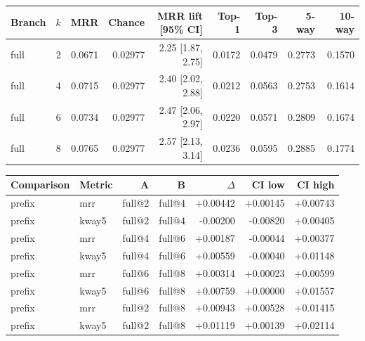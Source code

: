\begin{tabular}{lrrrrrrrr}
Branch & $k$ & MRR & Chance & MRR lift [95\% CI] & Top-1 & Top-3 & 5-way & 10-way \\
\hline
full & 2 & 0.0671 & 0.02977 & 2.25 [1.87, 2.75] & 0.0172 & 0.0479 & 0.2773 & 0.1570 \\
full & 4 & 0.0715 & 0.02977 & 2.40 [2.02, 2.88] & 0.0212 & 0.0563 & 0.2753 & 0.1614 \\
full & 6 & 0.0734 & 0.02977 & 2.47 [2.06, 2.97] & 0.0220 & 0.0571 & 0.2809 & 0.1674 \\
full & 8 & 0.0765 & 0.02977 & 2.57 [2.13, 3.14] & 0.0236 & 0.0595 & 0.2885 & 0.1774 \\
\end{tabular}
\begin{tabular}{llrrrrr}
Comparison & Metric & A & B & $\Delta$ & CI low & CI high \\
\hline
prefix & mrr & full@2 & full@4 & +0.00442 & +0.00145 & +0.00743 \\
prefix & kway5 & full@2 & full@4 & -0.00200 & -0.00820 & +0.00405 \\
prefix & mrr & full@4 & full@6 & +0.00187 & -0.00044 & +0.00377 \\
prefix & kway5 & full@4 & full@6 & +0.00559 & -0.00040 & +0.01148 \\
prefix & mrr & full@6 & full@8 & +0.00314 & +0.00023 & +0.00599 \\
prefix & kway5 & full@6 & full@8 & +0.00759 & +0.00000 & +0.01557 \\
prefix & mrr & full@2 & full@8 & +0.00943 & +0.00528 & +0.01415 \\
prefix & kway5 & full@2 & full@8 & +0.01119 & +0.00139 & +0.02114 \\
\end{tabular}

